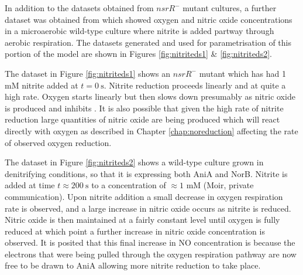 In addition to the datasets obtained from $nsrR^-$ mutant cultures, a further dataset was obtained from \citet{Rock2005} which showed oxygen and nitric oxide concentrations in a microaerobic wild-type culture where nitrite is added partway through aerobic respiration. The datasets generated and used for parametrisation of this portion of the model are shown in Figures \ref{fig:nitriteds1} \& \ref{fig:nitriteds2}.

The dataset in Figure \ref{fig:nitriteds1} shows an $nsrR^-$ mutant which has had 1 mM nitrite added at $t=0~\mathrm{s}$. Nitrite reduction proceeds linearly and at quite a high rate. Oxygen starts linearly but then slows down presumably as nitric oxide is produced and inhibits \cbbthree{}. It is also possible that given the high rate of nitrite reduction large quantities of nitric oxide are being produced which will react directly with oxygen as described in Chapter \ref{chap:noreduction} affecting the rate of observed oxygen reduction.

The dataset in Figure \ref{fig:nitriteds2} shows a wild-type culture grown in denitrifying conditions, so that it is expressing both AniA and NorB. Nitrite is added at time $t\approx200~\mathrm{s}$ to a concentration of $\approx 1$ mM (Moir, private communication). Upon nitrite addition a small decrease in oxygen respiration rate is observed, and a large increase in nitric oxide occurs as nitrite is reduced. Nitric oxide is then maintained at a fairly constant level until oxygen is fully reduced at which point a further increase in nitric oxide concentration is observed. It is posited that this final increase in NO concentration is because the electrons that were being pulled through the oxygen respiration pathway are now free to be drawn to AniA allowing more nitrite reduction to take place.

